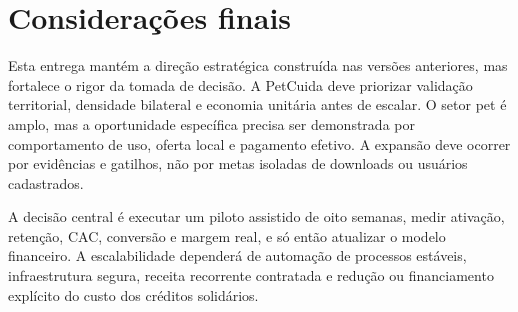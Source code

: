 \section{Considerações finais}
Esta entrega mantém a direção estratégica construída nas versões anteriores, mas fortalece o rigor da tomada de decisão. A PetCuida deve priorizar validação territorial, densidade bilateral e economia unitária antes de escalar. O setor pet é amplo, mas a oportunidade específica precisa ser demonstrada por comportamento de uso, oferta local e pagamento efetivo. A expansão deve ocorrer por evidências e gatilhos, não por metas isoladas de downloads ou usuários cadastrados.

A decisão central é executar um piloto assistido de oito semanas, medir ativação, retenção, CAC, conversão e margem real, e só então atualizar o modelo financeiro. A escalabilidade dependerá de automação de processos estáveis, infraestrutura segura, receita recorrente contratada e redução ou financiamento explícito do custo dos créditos solidários.